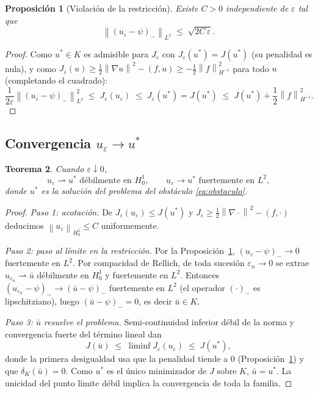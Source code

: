 \documentclass[11pt,a4paper]{article}
\newtheorem{teorema}{Teorema}[section]
\newtheorem{proposicion}[teorema]{Proposición}
\theoremstyle{definition}
\theoremstyle{remark}
\newcommand{\Norm}[1]{\left\lVert #1 \right\rVert}
\begin{document}
\begin{proposicion}[Violación de la restricción]\label{prop:violacion}
Existe $C > 0$ independiente de $\varepsilon$ tal que
\[
\Norm{(u_\varepsilon - \psi)_-}_{L^2} \;\le\; \sqrt{2 C \,\varepsilon} .
\]
\end{proposicion}

\begin{proof}
Como $u^\ast \in K$ es admisible para $J_\varepsilon$ con
$J_\varepsilon(u^\ast) = J(u^\ast)$ (su penalidad es nula), y como
$J_\varepsilon(u) \ge \frac12\Norm{\nabla u}^2 - (f, u) \ge
-\frac12 \Norm{f}_{H^{-1}}^2$ para todo $u$ (completando el cuadrado):
\[
\frac{1}{2\varepsilon}\Norm{(u_\varepsilon - \psi)_-}_{L^2}^2
\;\le\; J_\varepsilon(u_\varepsilon) \;\le\; J_\varepsilon(u^\ast) = J(u^\ast)
\;\le\; J(u^\ast) + \frac12\Norm{f}_{H^{-1}}^2 .
\]
\end{proof}

\subsection{Convergencia $u_\varepsilon \to u^\ast$}

\begin{teorema}\label{thm:convergencia}
Cuando $\varepsilon \downarrow 0$,
\[
u_\varepsilon \rightharpoonup u^\ast \text{ débilmente en } H^1_0,
\qquad
u_\varepsilon \to u^\ast \text{ fuertemente en } L^2,
\]
donde $u^\ast$ es la solución del problema del obstáculo \eqref{eq:obstaculo}.
\end{teorema}

\begin{proof}
\emph{Paso 1: acotación.} De $J_\varepsilon(u_\varepsilon) \le J(u^\ast)$ y
$J_\varepsilon \ge \frac12\Norm{\nabla\cdot}^2 - (f,\cdot)$ deducimos
$\Norm{u_\varepsilon}_{H^1_0} \le C$ uniformemente.

\emph{Paso 2: paso al límite en la restricción.}
Por la Proposición~\ref{prop:violacion}, $(u_\varepsilon - \psi)_- \to 0$
fuertemente en $L^2$. Por compacidad de Rellich, de toda sucesión
$\varepsilon_n \to 0$ se extrae $u_{\varepsilon_n} \rightharpoonup \bar u$
débilmente en $H^1_0$ y fuertemente en $L^2$. Entonces
$(u_{\varepsilon_n} - \psi)_- \to (\bar u - \psi)_-$ fuertemente en $L^2$
(el operador $(\cdot)_-$ es lipschitziano), luego $(\bar u - \psi)_- = 0$,
es decir $\bar u \in K$.

\emph{Paso 3: $\bar u$ resuelve el problema.} Semi-continuidad inferior
débil de la norma y convergencia fuerte del término lineal dan
\[
J(\bar u) \;\le\; \liminf J_\varepsilon(u_\varepsilon)
\;\le\; J(u^\ast),
\]
donde la primera desigualdad usa que la penalidad tiende a $0$
(Proposición~\ref{prop:violacion}) y que $\delta_K(\bar u) = 0$. Como
$u^\ast$ es el único minimizador de $J$ sobre $K$, $\bar u = u^\ast$.
La unicidad del punto límite débil implica la convergencia de toda la
familia.
\end{proof}
\end{document}
